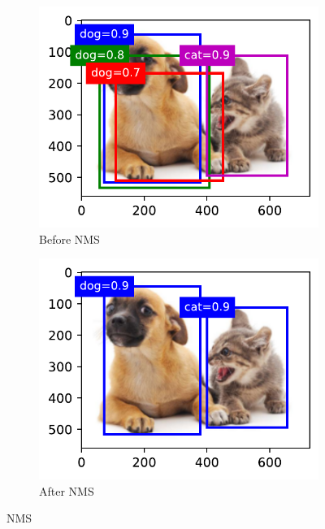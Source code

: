 \documentclass{article}
\begin{document}
\begin{figure}[ht!]
    \centering
    \begin{subfigure}[b]{0.45\linewidth}
    \includegraphics[width = \linewidth]{output_anchor_f592d1_174_1.pdf}
    \caption{Before NMS}
    \label{fig4a}
    \end{subfigure}
    \begin{subfigure}[b]{0.45\linewidth}
        \includegraphics[width = \linewidth]{output_anchor_f592d1_192_1.pdf}
        \caption{After NMS}
        \label{fig4b}
    \end{subfigure}
    \label{fig4}
    \caption{NMS}
\end{figure}
\end{document}
